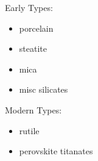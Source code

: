            Early Types:
            \begin{itemize}
                \item porcelain
                \item steatite
                \item mica
                \item misc silicates
            \end{itemize}
               

            Modern Types:
            \begin{itemize}
                \item rutile
                \item perovskite titanates \cite{hist_cerFilt}
            \end{itemize}

